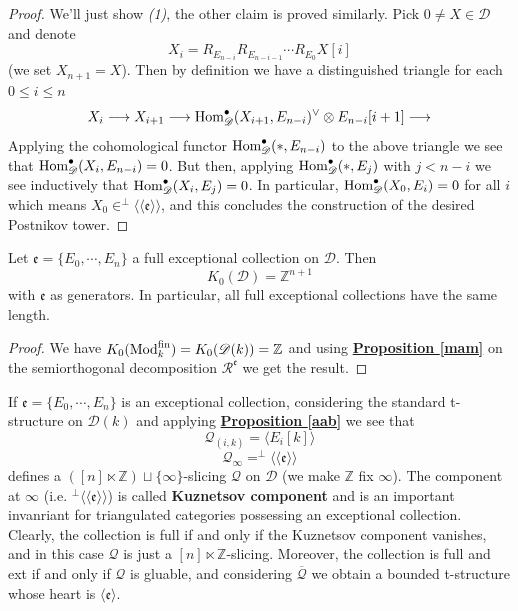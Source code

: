 \begin{proof}
We'll just show \textit{(1)}, the other claim is proved similarly. Pick $0 \not = X \in \mathscr{D}$ and denote $$X_i=R_{E_{n-i}}R_{E_{n-i-1}} \cdots R_{E_0}X[i]$$ (we set $X_{n+1}=X$). Then by definition we have a distinguished triangle for each $0 \le i \le n$ $$X_i \longrightarrow X_{i+1} \longrightarrow \textnormal{Hom}_{\mathscr{D}}^{\bullet}(X_{i+1},E_{n-i})^{\vee} \otimes E_{n-i}[i+1] \longrightarrow$$ 
Applying the cohomological functor $\textnormal{Hom}_{\mathscr{D}}^{\bullet}(*,E_{n-i})$ to the above triangle we see that $\textnormal{Hom}_{\mathscr{D}}^{\bullet}(X_i,E_{n-i})=0$. But then, applying $\textnormal{Hom}_{\mathscr{D}}^{\bullet}(*,E_j)$ with $j<n-i$ we see inductively that $\textnormal{Hom}_{\mathscr{D}}^{\bullet}(X_i,E_j)=0$. In particular, $\textnormal{Hom}_{\mathscr{D}}^{\bullet}(X_0,E_i)=0$ for all $i$ which means $X_0 \in ^{\perp}\langle \langle \mathfrak{e} \rangle \rangle$, and this concludes the construction of the desired Postnikov tower. 
\end{proof}

\begin{prop}
Let $\mathfrak{e}=\{  E_0, \cdots , E_n \}$ a full exceptional collection on $\mathscr{D}$. Then $$K_0(\mathscr{D})=\mathbb{Z}^{n+1}$$ 
with $\mathfrak{e}$ as generators. In particular, all full exceptional collections have the same length. 
\end{prop}

\begin{proof}
We have $K_0(\textnormal{Mod}_k^{\textnormal{fin}})=K_0(\mathscr{D}(k))=\mathbb{Z}$ and using \hyperref[mam]{\textbf{Proposition \ref*{mam}}} on the semiorthogonal decomposition $\mathscr{R}^{\mathfrak{e}}$ we get the result. 
\end{proof}

If $\mathfrak{e}=\{  E_0, \cdots , E_n \}$ is an exceptional collection, considering the standard t-structure on $\mathscr{D}(k)$ and applying \hyperref[aab]{\textbf{Proposition \ref*{aab}}} we see that $$\mathscr{Q}_{(i,k)}=\langle E_i[k] \rangle $$ $$\mathscr{Q}_{\infty}=^{\perp}\langle \langle \mathfrak{e} \rangle \rangle$$ defines a $([n] \ltimes \mathbb{Z}) \sqcup \{ \infty \}$-slicing $\mathscr{Q}$ on $\mathscr{D}$ (we make $\mathbb{Z}$ fix $\infty$). The component at $\infty$ (i.e. $^{\perp}\langle \langle \mathfrak{e} \rangle \rangle$) is called \textbf{Kuznetsov component} and is an important invanriant for triangulated categories possessing an exceptional collection. Clearly, the collection is full if and only if the Kuznetsov component vanishes, and in this case $\mathscr{Q}$ is just a $[n] \ltimes \mathbb{Z}$-slicing. Moreover, the collection is full and ext if and only if $\mathscr{Q}$ is gluable, and considering $\overline{\mathscr{Q}}$ we obtain a bounded t-structure whose heart is $\langle \mathfrak{e} \rangle$. \\

